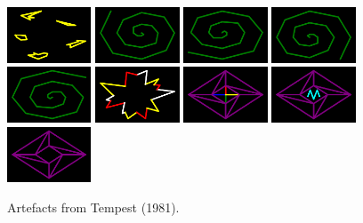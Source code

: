 \begin{figure}[H]
    \includegraphics[width=2.5cm]{preface/vector_images/vec_image_shrap.png}
    \includegraphics[width=2.5cm]{preface/vector_images/vec_image_spira1.png}
    \includegraphics[width=2.5cm]{preface/vector_images/vec_image_spira2.png}
    \includegraphics[width=2.5cm]{preface/vector_images/vec_image_spira3.png}
    \includegraphics[width=2.5cm]{preface/vector_images/vec_image_spira4.png}
    \includegraphics[width=2.5cm]{preface/vector_images/vec_image_splat.png}
    \includegraphics[width=2.5cm]{preface/vector_images/vec_image_tankf.png}
    \includegraphics[width=2.5cm]{preface/vector_images/vec_image_tankp.png}
    \includegraphics[width=2.5cm]{preface/vector_images/vec_image_tankr.png}
  \caption*{Artefacts from Tempest (1981).}
\end{figure}
\vspace*{\fill}
\thispagestyle{empty} %
\clearpage

